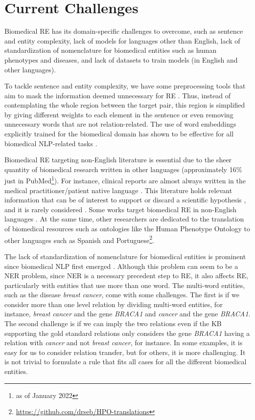 \section{Current Challenges} 

Biomedical RE has its domain-specific challenges to overcome, such as sentence and entity complexity, lack of models for languages other than English, lack of standardization of nomenclature for biomedical entities such as human phenotypes and diseases, and lack of datasets to train models (in English and other languages). 

To tackle sentence and entity complexity, we have some preprocessing tools that aim to mask the information deemed unnecessary for RE \citep{miwa2010entity,lee2020biobert}. Thus, instead of contemplating the whole region between the target pair, this region is simplified by giving different weights to each element in the sentence or even removing unnecessary words that are not relation-related. The use of word embeddings explicitly trained for the biomedical domain has shown to be effective for all biomedical NLP-related tasks \citep{lee2020biobert,scibert}.

Biomedical RE targeting non-English literature is essential due to the sheer quantity of biomedical research written in other languages (approximately 16\% just in PubMed\footnote{as of January 2022}). For instance, clinical reports are almost always written in the medical practitioner/patient native language \citep{10.1093/database/bax064}. This literature holds relevant information that can be of interest to support or discard a scientific hypothesis \citep{nussbaumer2020excluding}, and it is rarely considered \citep{di2017publish}. Some works target biomedical RE in non-English languages \citep{6103454}. At the same time, other researchers are dedicated to the translation of biomedical resources such as ontologies like the Human Phenotype Ontology to other languages such as Spanish and Portuguese\footnote{\url{https://github.com/drseb/HPO-translations}}. 

The lack of standardization of nomenclature for biomedical entities is prominent since biomedical NLP first emerged \citep{leser2005makes,horwitz2011naming}. Although this problem can seem to be a NER problem, since NER is a necessary precedent step to RE, it also affects RE, particularly with entities that use more than one word. The multi-word entities, such as the disease \textit{breast cancer}, come with some challenges. The first is if we consider more than one level relation by dividing multi-word entities, for instance, \textit{breast cancer} and the gene \textit{BRACA1} and \textit{cancer} and the gene \textit{BRACA1}. The second challenge is if we can imply the two relations even if the KB supporting the gold standard relations only considers the gene \textit{BRACA1} having a relation with \textit{cancer} and not \textit{breast cancer}, for instance. In some examples, it is easy for us to consider relation transfer, but for others, it is more challenging. It is not trivial to formulate a rule that fits all cases for all the different biomedical entities. 


